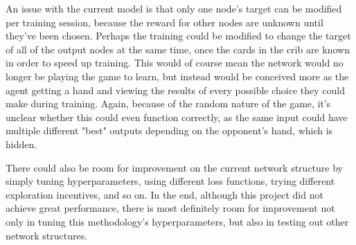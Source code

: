 \documentclass[]{article}
\begin{document}
An issue with the current model is that only one node's target can be modified per training session, because the reward for other nodes are unknown until they've been chosen. Perhaps the training could be modified to change the target of all of the output nodes at the same time, once the cards in the crib are known in order to speed up training. This would of course mean the network would no longer be playing the game to learn, but instead would be conceived more as the agent getting a hand and viewing the results of every possible choice they could make during training. Again, because of the random nature of the game, it's unclear whether this could even function correctly, as the same input could have multiple different "best" outputs depending on the opponent's hand, which is hidden.

There could also be room for improvement on the current network structure by simply tuning hyperparameters, using different loss functions, trying different exploration incentives, and so on. In the end, although this project did not achieve great performance, there is most definitely room for improvement not only in tuning this methodology's hyperparameters, but also in testing out other network structures.


\newpage


\end{document}
